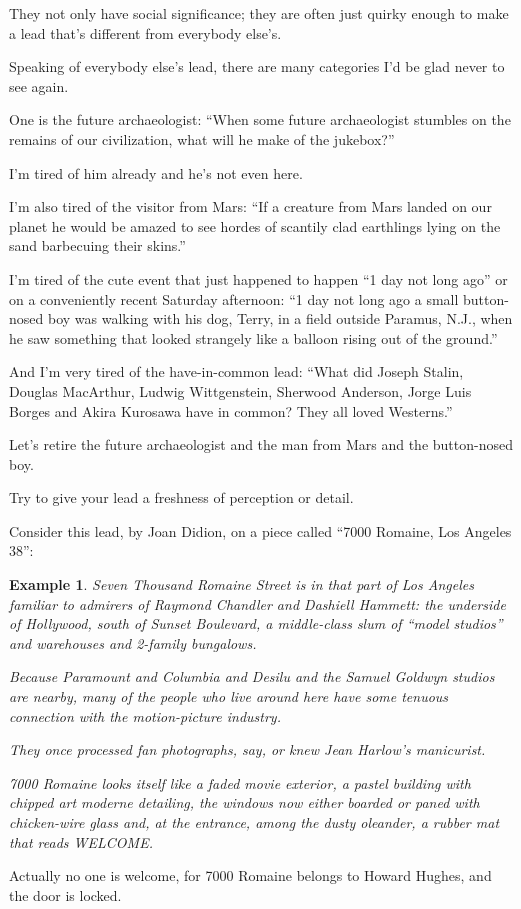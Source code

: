 \documentclass{book}
\numberwithin{equation}{section}
\newtheorem{example}{Example}[chapter]
\begin{document}
They not only have social significance; they are often just quirky enough to make a lead that's different from everybody else's.

%
Speaking of everybody else's lead, there are many categories I'd be glad never to see again.

One is the future archaeologist: ``When some future archaeologist stumbles on the remains of our civilization, what will he make of the jukebox?''

I'm tired of him already and he's not even here.

I'm also tired of the visitor from Mars: ``If a creature from Mars landed on our planet he would be amazed to see hordes of scantily clad earthlings lying on the sand barbecuing their skins.''

I'm tired of the cute event that just happened to happen ``1 day not long ago'' or on a conveniently recent Saturday afternoon: ``1 day not long ago a small button-nosed boy was walking with his dog, Terry, in a field outside Paramus, N.J., when he saw something that looked strangely like a balloon rising out of the ground.''

And I'm very tired of the have-in-common lead: ``What did Joseph Stalin, Douglas MacArthur, Ludwig Wittgenstein, Sherwood Anderson, Jorge Luis Borges and Akira Kurosawa have in common? They all loved Westerns.''

Let's retire the future archaeologist and the man from Mars and the button-nosed boy.

Try to give your lead a freshness of perception or detail.

%
Consider this lead, by Joan Didion, on a piece called ``7000 Romaine, Los Angeles 38'':
\begin{example}
    Seven Thousand Romaine Street is in that part of Los Angeles familiar to admirers of Raymond Chandler and Dashiell Hammett: the underside of Hollywood, south of Sunset Boulevard, a middle-class slum of ``model studios'' and warehouses and 2-family bungalows.
    
    Because Paramount and Columbia and Desilu and the Samuel Goldwyn studios are nearby, many of the people who live around here have some tenuous connection with the motion-picture industry.
    
    They once processed fan photographs, say, or knew Jean Harlow's manicurist.
    
    7000 Romaine looks itself like a faded movie exterior, a pastel building with chipped \textit{art moderne} detailing, the windows now either boarded or paned with chicken-wire glass and, at the entrance, among the dusty oleander, a rubber mat that reads WELCOME.
\end{example}
Actually no one is welcome, for 7000 Romaine belongs to Howard Hughes, and the door is locked.
\end{document}
